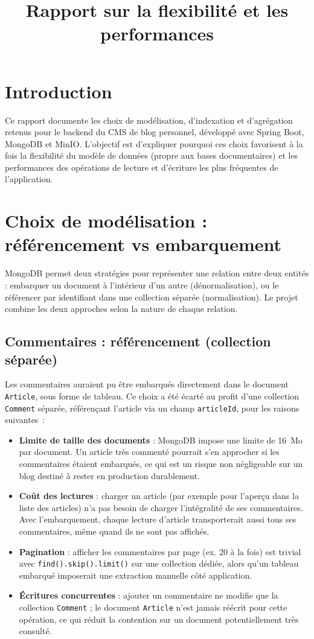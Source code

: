 \documentclass[11pt,a4paper]{article}
\title{\color{primaryblue}\textbf{Rapport sur la flexibilité et les performances}}
\author{}
\date{}
\begin{document}
\maketitle
\thispagestyle{fancy}

\section{Introduction}
Ce rapport documente les choix de modélisation, d'indexation et d'agrégation retenus pour le backend du CMS de blog personnel, développé avec Spring Boot, MongoDB et MinIO. L'objectif est d'expliquer pourquoi ces choix favorisent à la fois la flexibilité du modèle de données (propre aux bases documentaires) et les performances des opérations de lecture et d'écriture les plus fréquentes de l'application.

\section{Choix de modélisation : référencement vs embarquement}
MongoDB permet deux stratégies pour représenter une relation entre deux entités : embarquer un document à l'intérieur d'un autre (dénormalisation), ou le référencer par identifiant dans une collection séparée (normalisation). Le projet combine les deux approches selon la nature de chaque relation.

\subsection{Commentaires : référencement (collection séparée)}
Les commentaires auraient pu être embarqués directement dans le document \texttt{Article}, sous forme de tableau. Ce choix a été écarté au profit d'une collection \texttt{Comment} séparée, référençant l'article via un champ \texttt{articleId}, pour les raisons suivantes~:

\begin{itemize}[leftmargin=1.2em]
  \item \textbf{Limite de taille des documents} : MongoDB impose une limite de 16~Mo par document. Un article très commenté pourrait s'en approcher si les commentaires étaient embarqués, ce qui est un risque non négligeable sur un blog destiné à rester en production durablement.
  \item \textbf{Coût des lectures} : charger un article (par exemple pour l'aperçu dans la liste des articles) n'a pas besoin de charger l'intégralité de ses commentaires. Avec l'embarquement, chaque lecture d'article transporterait aussi tous ses commentaires, même quand ils ne sont pas affichés.
  \item \textbf{Pagination} : afficher les commentaires par page (ex. 20 à la fois) est trivial avec \texttt{find().skip().limit()} sur une collection dédiée, alors qu'un tableau embarqué imposerait une extraction manuelle côté application.
  \item \textbf{Écritures concurrentes} : ajouter un commentaire ne modifie que la collection \texttt{Comment} ; le document \texttt{Article} n'est jamais réécrit pour cette opération, ce qui réduit la contention sur un document potentiellement très consulté.
\end{itemize}
\end{document}

